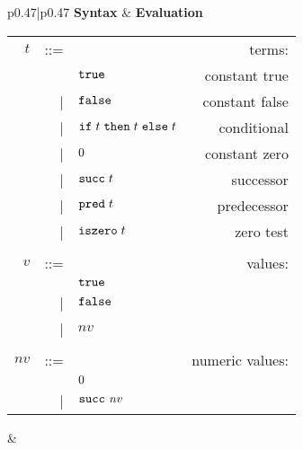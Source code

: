 \begin{figure}[h]
\footnotesize
\begin{tabular}{p{}|p{}}
    \textbf{Syntax} & \textbf{Evaluation} \tabularnewline[1em]
    \begin{tabular}{r@{\hspace{0.5em}}r@{\hspace{0.5em}}l@{\hspace{0.5em}}r}

              $t$ & ::= &                       & terms:          \\
                  &     & $\texttt{true}$               & constant true   \\
                  & |   & $\texttt{false}$              & constant false  \\
                  & |   & $\texttt{if\;}t\texttt{\;then\;}t\texttt{\;else\;}t$       & conditional     \\
                  & |   & $0$               & constant zero   \\
                  & |   & $\texttt{succ\;}t$           & successor       \\
                  & |   & $\texttt{pred\;}t$           & predecessor     \\
                  & |   & $\texttt{iszero\;}t$         & zero test       \\
                  &     &                       &                 \\
              $v$ & ::= &                       & values:         \\
                  &     & $\texttt{true}$               &                 \\
                  & |   & $\texttt{false}$              &                 \\
                  & |   & $\mathit{nv}$         &                 \\
                  &     &                       &                 \\
    $\mathit{nv}$ & ::= &                       & numeric values: \\
                  &     & $0$               &                 \\
                  & |   & $\texttt{succ\;}\mathit{nv}$ &                 \\
    \end{tabular}
&
    \renewcommand{\arraystretch}{2.5}
\end{tabular}
\end{figure}
